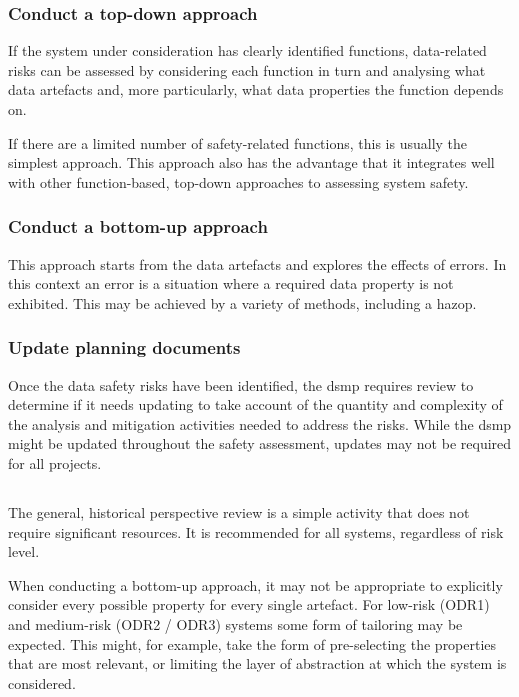 \subsubsection{Conduct a top-down approach}
If the system under consideration has clearly identified functions, data-related risks can be assessed by considering each function in turn and analysing what \glspl{data artefact} and, more particularly, what data properties the function depends on.

If there are a limited number of safety-related functions, this is usually the simplest approach. This approach also has the advantage that it integrates well with other function-based, top-down approaches to assessing system safety. 

\subsubsection{Conduct a bottom-up approach}
This approach starts from the \glspl{data artefact} and explores the effects of \glspl{error}. In this context an error is a situation where a required \gls{data property} is not exhibited. This may be achieved by a variety of methods, including a \gls{hazop}.

\subsubsection{Update planning documents}
Once the data safety risks have been identified, the \gls{dsmp} requires review to determine if it needs
updating to take account of the quantity and complexity of the analysis and \gls{mitigation} activities needed to address the risks. While the \gls{dsmp} might be updated throughout the \gls{safety assessment}, updates may not be required for all projects.

\subsection{}
The general, historical perspective review is a simple activity that does not require significant resources. It is recommended for all systems, regardless of risk level.

When conducting a bottom-up approach, it may not be appropriate to explicitly consider every possible property for every single artefact. For low-risk (ODR1) and medium-risk (ODR2 / ODR3) systems some form of \gls{tailoring} may be expected. This might, for example, take the form of pre-selecting the properties that are most relevant, or limiting the layer of abstraction at which the system is considered.

